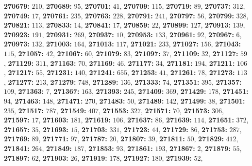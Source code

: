 \textsf{\bfseries 270679:} $210$, \textsf{\bfseries 270689:} $95$, \textsf{\bfseries 270701:} $41$, \textsf{\bfseries 270709:} $115$, \textsf{\bfseries 270719:} $89$, \textsf{\bfseries 270737:} $312$, \textsf{\bfseries 270749:} $17$, \textsf{\bfseries 270761:} $235$, \textsf{\bfseries 270763:} $228$, \textsf{\bfseries 270791:} $241$, \textsf{\bfseries 270797:} $56$, \textsf{\bfseries 270799:} $328$, \textsf{\bfseries 270821:} $113$, \textsf{\bfseries 270833:} $14$, \textsf{\bfseries 270841:} $17$, \textsf{\bfseries 270859:} $22$, \textsf{\bfseries 270899:} $127$, \textsf{\bfseries 270913:} $139$, \textsf{\bfseries 270923:} $191$, \textsf{\bfseries 270931:} $269$, \textsf{\bfseries 270937:} $10$, \textsf{\bfseries 270953:} $133$, \textsf{\bfseries 270961:} $92$, \textsf{\bfseries 270967:} $6$, \textsf{\bfseries 270973:} $132$, \textsf{\bfseries 271003:} $164$, \textsf{\bfseries 271013:} $117$, \textsf{\bfseries 271021:} $233$, \textsf{\bfseries 271027:} $156$, \textsf{\bfseries 271043:} $115$, \textsf{\bfseries 271057:} $42$, \textsf{\bfseries 271067:} $60$, \textsf{\bfseries 271079:} $83$, \textsf{\bfseries 271097:} $37$, \textsf{\bfseries 271109:} $32$, \textsf{\bfseries 271127:} $59$, \textsf{\bfseries 271129:} $311$, \textsf{\bfseries 271163:} $70$, \textsf{\bfseries 271169:} $46$, \textsf{\bfseries 271177:} $34$, \textsf{\bfseries 271181:} $194$, \textsf{\bfseries 271211:} $106$, \textsf{\bfseries 271217:} $55$, \textsf{\bfseries 271231:} $140$, \textsf{\bfseries 271241:} $655$, \textsf{\bfseries 271253:} $41$, \textsf{\bfseries 271261:} $78$, \textsf{\bfseries 271273:} $113$, \textsf{\bfseries 271277:} $213$, \textsf{\bfseries 271279:} $748$, \textsf{\bfseries 271289:} $136$, \textsf{\bfseries 271333:} $74$, \textsf{\bfseries 271351:} $395$, \textsf{\bfseries 271357:} $109$, \textsf{\bfseries 271363:} $7$, \textsf{\bfseries 271367:} $163$, \textsf{\bfseries 271393:} $245$, \textsf{\bfseries 271409:} $369$, \textsf{\bfseries 271429:} $178$, \textsf{\bfseries 271451:} $94$, \textsf{\bfseries 271463:} $148$, \textsf{\bfseries 271471:} $270$, \textsf{\bfseries 271483:} $50$, \textsf{\bfseries 271489:} $142$, \textsf{\bfseries 271499:} $38$, \textsf{\bfseries 271501:} $235$, \textsf{\bfseries 271517:} $787$, \textsf{\bfseries 271549:} $407$, \textsf{\bfseries 271553:} $327$, \textsf{\bfseries 271571:} $70$, \textsf{\bfseries 271573:} $306$, \textsf{\bfseries 271597:} $17$, \textsf{\bfseries 271603:} $181$, \textsf{\bfseries 271619:} $106$, \textsf{\bfseries 271637:} $86$, \textsf{\bfseries 271639:} $114$, \textsf{\bfseries 271651:} $372$, \textsf{\bfseries 271657:} $35$, \textsf{\bfseries 271693:} $15$, \textsf{\bfseries 271703:} $331$, \textsf{\bfseries 271723:} $44$, \textsf{\bfseries 271729:} $86$, \textsf{\bfseries 271753:} $287$, \textsf{\bfseries 271769:} $89$, \textsf{\bfseries 271771:} $97$, \textsf{\bfseries 271787:} $20$, \textsf{\bfseries 271807:} $39$, \textsf{\bfseries 271811:} $50$, \textsf{\bfseries 271829:} $412$, \textsf{\bfseries 271841:} $264$, \textsf{\bfseries 271849:} $187$, \textsf{\bfseries 271853:} $93$, \textsf{\bfseries 271861:} $193$, \textsf{\bfseries 271867:} $2$, \textsf{\bfseries 271879:} $55$, \textsf{\bfseries 271897:} $62$, \textsf{\bfseries 271903:} $26$, \textsf{\bfseries 271919:} $178$, \textsf{\bfseries 271927:} $180$, \textsf{\bfseries 271939:} $52$, 

